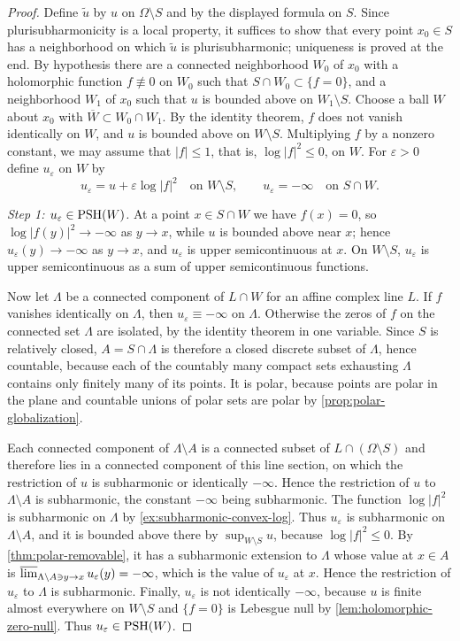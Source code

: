 \begin{proof}
Define $\widetilde u$ by $u$ on $\Omega\setminus S$ and by the displayed formula on $S$. Since plurisubharmonicity is a local property, it suffices to show that every point $x_0\in S$ has a neighborhood on which $\widetilde u$ is plurisubharmonic; uniqueness is proved at the end. By hypothesis there are a connected neighborhood $W_0$ of $x_0$ with a holomorphic function $f\not\equiv0$ on $W_0$ such that $S\cap W_0\subset\{f=0\}$, and a neighborhood $W_1$ of $x_0$ such that $u$ is bounded above on $W_1\setminus S$. Choose a ball $W$ about $x_0$ with $\overline W\subset W_0\cap W_1$. By the identity theorem, $f$ does not vanish identically on $W$, and $u$ is bounded above on $W\setminus S$. Multiplying $f$ by a nonzero constant, we may assume that $|f|\leq1$, that is, $\log|f|^2\le0$, on $W$. For $\varepsilon>0$ define $u_\varepsilon$ on $W$ by
\[
 u_\varepsilon=u+\varepsilon\log|f|^2\quad\text{on }W\setminus S,\qquad
 u_\varepsilon=-\infty\quad\text{on }S\cap W.
\]

\emph{Step 1: $u_\varepsilon\in\mathrm{PSH}(W)$.} At a point $x\in S\cap W$ we have $f(x)=0$, so $\log|f(y)|^2\to-\infty$ as $y\to x$, while $u$ is bounded above near $x$; hence $u_\varepsilon(y)\to-\infty$ as $y\to x$, and $u_\varepsilon$ is upper semicontinuous at $x$. On $W\setminus S$, $u_\varepsilon$ is upper semicontinuous as a sum of upper semicontinuous functions.

Now let $\Lambda$ be a connected component of $L\cap W$ for an affine complex line $L$. If $f$ vanishes identically on $\Lambda$, then $u_\varepsilon\equiv-\infty$ on $\Lambda$. Otherwise the zeros of $f$ on the connected set $\Lambda$ are isolated, by the identity theorem in one variable. Since $S$ is relatively closed, $A=S\cap\Lambda$ is therefore a closed discrete subset of $\Lambda$, hence countable, because each of the countably many compact sets exhausting $\Lambda$ contains only finitely many of its points. It is polar, because points are polar in the plane and countable unions of polar sets are polar by \cref{prop:polar-globalization}.

Each connected component of $\Lambda\setminus A$ is a connected subset of $L\cap(\Omega\setminus S)$ and therefore lies in a connected component of this line section, on which the restriction of $u$ is subharmonic or identically $-\infty$. Hence the restriction of $u$ to $\Lambda\setminus A$ is subharmonic, the constant $-\infty$ being subharmonic. The function $\log|f|^2$ is subharmonic on $\Lambda$ by \cref{ex:subharmonic-convex-log}. Thus $u_\varepsilon$ is subharmonic on $\Lambda\setminus A$, and it is bounded above there by $\sup_{W\setminus S}u$, because $\log|f|^2\leq0$. By \cref{thm:polar-removable}, it has a subharmonic extension to $\Lambda$ whose value at $x\in A$ is $\varlimsup_{\Lambda\setminus A\ni y\to x}u_\varepsilon(y)=-\infty$, which is the value of $u_\varepsilon$ at $x$. Hence the restriction of $u_\varepsilon$ to $\Lambda$ is subharmonic. Finally, $u_\varepsilon$ is not identically $-\infty$, because $u$ is finite almost everywhere on $W\setminus S$ and $\{f=0\}$ is Lebesgue null by \cref{lem:holomorphic-zero-null}. Thus $u_\varepsilon\in\mathrm{PSH}(W)$.


\end{proof}
